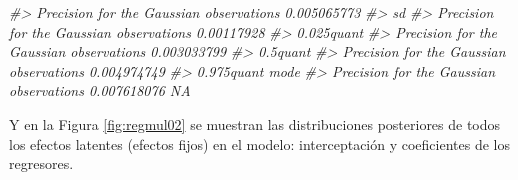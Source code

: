 \documentclass[
]{book}
\newenvironment{Shaded}{\begin{snugshade}}{\end{snugshade}}
\newcommand{\AttributeTok}[1]{\textcolor[rgb]{0.77,0.63,0.00}{#1}}
\newcommand{\CommentTok}[1]{\textcolor[rgb]{0.56,0.35,0.01}{\textit{#1}}}
\newcommand{\ControlFlowTok}[1]{\textcolor[rgb]{0.13,0.29,0.53}{\textbf{#1}}}
\newcommand{\DecValTok}[1]{\textcolor[rgb]{0.00,0.00,0.81}{#1}}
\newcommand{\FloatTok}[1]{\textcolor[rgb]{0.00,0.00,0.81}{#1}}
\newcommand{\FunctionTok}[1]{\textcolor[rgb]{0.00,0.00,0.00}{#1}}
\newcommand{\NormalTok}[1]{#1}
\newcommand{\OtherTok}[1]{\textcolor[rgb]{0.56,0.35,0.01}{#1}}
\newcommand{\SpecialCharTok}[1]{\textcolor[rgb]{0.00,0.00,0.00}{#1}}
\newcommand{\StringTok}[1]{\textcolor[rgb]{0.31,0.60,0.02}{#1}}
\begin{document}
\begin{Shaded}
\begin{Highlighting}[]
\CommentTok{\#\textgreater{} Precision for the Gaussian observations 0.005065773}
\CommentTok{\#\textgreater{}                                                 sd}
\CommentTok{\#\textgreater{} Precision for the Gaussian observations 0.00117928}
\CommentTok{\#\textgreater{}                                          0.025quant}
\CommentTok{\#\textgreater{} Precision for the Gaussian observations 0.003033799}
\CommentTok{\#\textgreater{}                                            0.5quant}
\CommentTok{\#\textgreater{} Precision for the Gaussian observations 0.004974749}
\CommentTok{\#\textgreater{}                                          0.975quant mode}
\CommentTok{\#\textgreater{} Precision for the Gaussian observations 0.007618076   NA}
\end{Highlighting}
\end{Shaded}

Y en la Figura \ref{fig:regmul02} se muestran las distribuciones posteriores de todos los efectos latentes (efectos fijos) en el modelo: interceptación y coeficientes de los regresores.

\begin{Shaded}
\end{Shaded}
\end{document}
